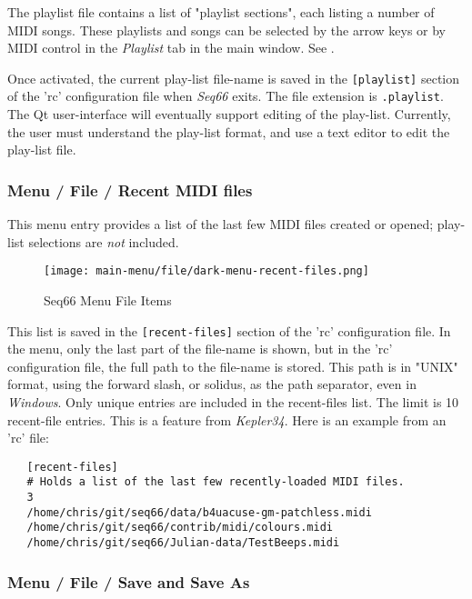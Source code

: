    The playlist file contains a list of "playlist sections",
   each listing a number of MIDI songs.
   These playlists and songs can be
   selected by the arrow keys or by MIDI control in the \textsl{Playlist} tab
   in the main window.
   See .

   Once activated, the current play-list file-name is saved in the
   \texttt{[playlist]} section of the 'rc' configuration file when
   \textsl{Seq66} exits.
   The file extension is \texttt{.playlist}.
   The Qt user-interface will eventually support editing of the play-list.
   Currently, the user must understand the play-list format, and use a
   text editor to edit the play-list file.

\subsubsection{Menu / File / Recent MIDI files}
\label{subsubsec:seq66_menu_file_recent}

   This menu entry provides a list of the last few MIDI files created or opened;
   play-list selections are \textsl{not} included.

\begin{figure}[H]
   \centering 
   \texttt{[image: main-menu/file/dark-menu-recent-files.png]}
   \caption{Seq66 Menu File Items}
   \label{fig:seq66_menu_file_items}
\end{figure}

   This list is saved in the \texttt{[recent-files]} section of the
   'rc' configuration file.
   In the menu, only the last part of the file-name is
   shown, but in the 'rc' configuration file,
   the full path to the file-name is stored.
   This path is in "UNIX" format, using the forward slash, or solidus,
   as the path separator, even in \textsl{Windows}.
   Only unique entries are included in the recent-files list.
   The limit is 10 recent-file entries.
   This is a feature from \textsl{Kepler34}.
   Here is an example from an 'rc' file:

\begin{verbatim}
   [recent-files]
   # Holds a list of the last few recently-loaded MIDI files.
   3
   /home/chris/git/seq66/data/b4uacuse-gm-patchless.midi
   /home/chris/git/seq66/contrib/midi/colours.midi
   /home/chris/git/seq66/Julian-data/TestBeeps.midi
\end{verbatim}

\subsubsection{Menu / File / Save and Save As}
\label{subsubsec:menu_file_open_save_as}

